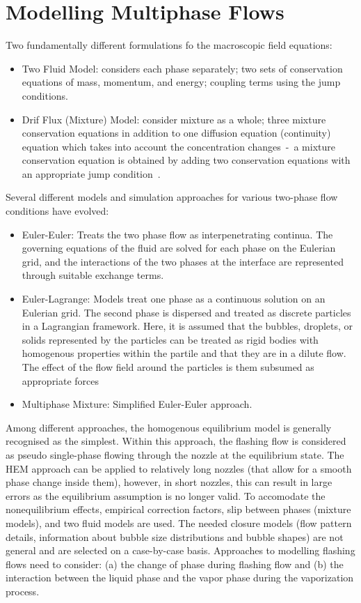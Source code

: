 \section{Modelling Multiphase Flows}
Two fundamentally different formulations fo the macroscopic field equations:
\begin{itemize}
\item Two Fluid Model: considers each phase separately; two sets of conservation equations of mass, momentum, and energy; coupling terms using the jump conditions.
\item Drif Flux (Mixture) Model: consider mixture as a whole; three mixture conservation equations in addition to one diffusion equation (continuity) equation which takes into account the concentration changes~-~a mixture conservation equation is obtained by adding two conservation equations with an appropriate jump condition~\cite{ishiiThermoFluidDynamicsTwoPhase2011}. 
\end{itemize}
Several different models and simulation approaches for various two-phase flow conditions have evolved:
\begin{itemize}
\item Euler-Euler: Treats the two phase flow as interpenetrating continua. The governing equations of the fluid are solved for each phase on the Eulerian grid, and the interactions of the two phases at the interface are represented through suitable exchange terms.
\item Euler-Lagrange: Models treat one phase as a continuous solution on an Eulerian grid. The second phase is dispersed and treated as discrete particles in a Lagrangian framework. Here, it is assumed that the bubbles, droplets, or solids represented by the particles can be treated as rigid bodies with homogenous properties within the partile and that they are in a dilute flow. The effect of the flow field around the particles is them subsumed as appropriate forces~\cite{Gartner2024-zh}
\item Multiphase Mixture: Simplified Euler-Euler approach. 
\end{itemize}

Among different approaches, the homogenous equilibrium model is generally recognised as the simplest.
Within this approach, the flashing flow is considered as pseudo single-phase flowing through the nozzle at the equilibrium state.
The HEM approach can be applied to relatively long nozzles (that allow for a smooth phase change inside them), however, in short nozzles, this can result in large errors as the equilibrium assumption is no longer valid.
To accomodate the nonequilibrium effects, empirical correction factors, slip between phases (mixture models), and two fluid models are used. The needed closure models (flow pattern details, information about bubble size distributions and bubble shapes) are not general and are selected on a case-by-case basis.
Approaches to modelling flashing flows need to consider: (a) the change of phase during flashing flow and (b) the interaction between the liquid phase and the vapor phase during the vaporization process.~\cite{dangleComputationalFluidDynamics2018}

